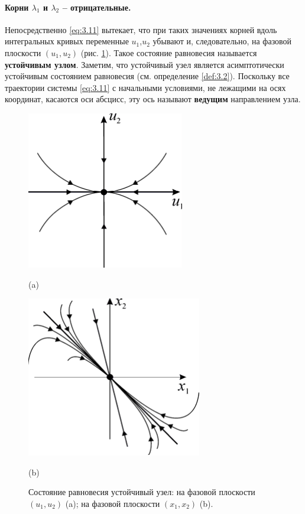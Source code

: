 \paragraph{Корни $\lambda_1$ и $\lambda_2$ -- отрицательные.}%
\label{par:korni_lambda_1_i_lambda_2_otritsatel_nye_}

Непосредственно \eqref{eq:3.11} вытекает, что при таких значениях корней вдоль интегральных кривых переменные $u_1$,$u_2$ убывают и, следовательно, на фазовой плоскости $(u_1,u_2)$ (рис. \ref{fig:3.3}). Такое состояние равновесия называется \textbf{ устойчивым узлом}. Заметим, что устойчивый узел является асимптотически устойчивым состоянием равновесия (см. определение \ref{def:3.2}). Поскольку все траектории системы \eqref{eq:3.11} с начальными условиями, не лежащими на осях координат, касаются оси абсцисс, эту ось называют \textbf{ ведущим} направлением узла.
\begin{figure}[h!]
        \centering
        \begin{minipage}{0.45\linewidth}
                \centering  
                \includegraphics[]{fig/lect3/3a}

                (a)
        \end{minipage}
        \begin{minipage}{0.45\linewidth}
                \centering  
                \includegraphics[]{fig/lect3/3b}

                (b)
        \end{minipage}

                \caption{Состояние равновесия устойчивый узел: на фазовой плоскости $( u_1,u_2)$ (a); на фазовой плоскости $(x_1,x_2)$ (b).}
        \label{fig:3.3}
\end{figure}
